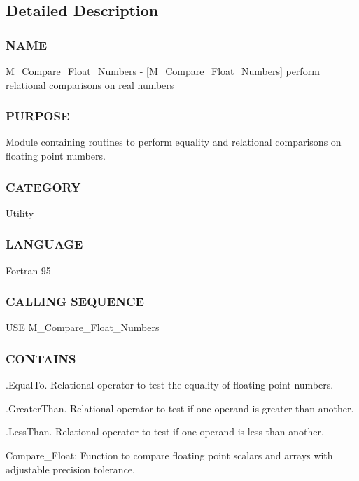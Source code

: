 \subsection{Detailed Description}
\subsubsection*{N\+A\+ME}

M\+\_\+\+Compare\+\_\+\+Float\+\_\+\+Numbers -\/ \mbox{[}M\+\_\+\+Compare\+\_\+\+Float\+\_\+\+Numbers\mbox{]} perform relational comparisons on real numbers 

\subsubsection*{P\+U\+R\+P\+O\+SE}

Module containing routines to perform equality and relational comparisons on floating point numbers.

\subsubsection*{C\+A\+T\+E\+G\+O\+RY}

Utility

\subsubsection*{L\+A\+N\+G\+U\+A\+GE}

Fortran-\/95

\subsubsection*{C\+A\+L\+L\+I\+NG S\+E\+Q\+U\+E\+N\+CE}

U\+SE M\+\_\+\+Compare\+\_\+\+Float\+\_\+\+Numbers

\subsubsection*{C\+O\+N\+T\+A\+I\+NS}

.Equal\+To. Relational operator to test the equality of floating point numbers.

.Greater\+Than. Relational operator to test if one operand is greater than another.

.Less\+Than. Relational operator to test if one operand is less than another.

Compare\+\_\+\+Float\+: Function to compare floating point scalars and arrays with adjustable precision tolerance.

